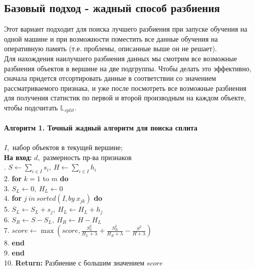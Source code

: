 \documentclass[12pt,fleqn]{article}
\begin{document}
\subsection{Базовый подход - жадный способ разбиения}
Этот вариант подходит для поиска лучшего разбиения при запуске обучения на одной машине и при возможности поместить все данные обучения на оперативную память (т.е. проблемы, описанные выше он не решает).\\

Для нахождения наилучшего разбиения данных мы смотрим все возможные разбиения объектов в вершине на две подгруппы. Чтобы делать это эффективно, сначала придется отсортировать данные в соответствии со значением рассматриваемого признака, и уже после посмотреть все возможные разбиения для получения статистик по первой и второй производным на каждом объекте, чтобы подсчитать $\mathbb{L}_{split}.$
\vspace{5pt}
\noindent
\hline\\
\hline\\ \vspace{5pt}
\textbf{Алгоритм 1. Точный жадный алгоритм для поиска сплита}\\
\hline\\ \vspace{10pt}
 $I$,~набор объектов в текущей вершине;\\
{\bf На вход:} $d$,~размерность пр-ва признаков
\hline\\ \vspace{10pt}
{\ttfamily
	. $S \leftarrow \sum_{i \in I}s_i,~H \leftarrow \sum_{i \in I}h_i$\\
	2. \textbf{for} $k = 1$ to $m$ \textbf{do}\\
	3. \hspace{20pt} $S_L \leftarrow 0,~H_L \leftarrow 0$\\
	4. \hspace{20pt} \textbf{for} $j~in~sorted(I, by~x_{jk})$ \textbf{do}\\
	5. \hspace{40pt} $S_L \leftarrow S_L + s_j,~H_L \leftarrow H_L + h_j$\\
	6. \hspace{40pt} $S_R \leftarrow S - S_L,~H_R \leftarrow H - H_L$\\
	7. \hspace{40pt} $score \leftarrow \max(score, \frac{S^2_L}{H_L + \lambda}+\frac{S^2_R}{H_R + \lambda} - \frac{S^2}{H + \lambda})$\\
	8. \hspace{20pt} \textbf{end}\\
	9. \textbf{end}\\
	10. \textbf{Return:} Разбиение с большим значением $score$\\
}
\vspace{5pt}
\hline
\vspace{5pt}
\end{document}
